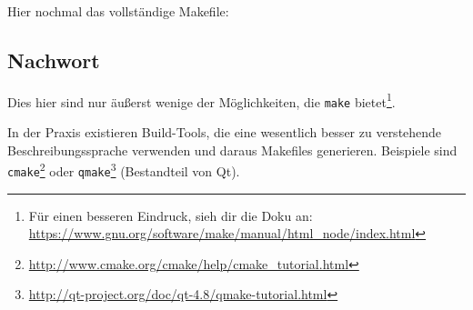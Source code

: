 Hier nochmal das vollständige Makefile:

\subsection{Nachwort}

Dies hier sind nur äußerst wenige der Möglichkeiten, die \texttt{make} bietet\footnote{Für einen besseren Eindruck, sieh dir die Doku an: \url{https://www.gnu.org/software/make/manual/html_node/index.html}}.

In der Praxis existieren Build-Tools, die eine wesentlich besser zu verstehende Beschreibungssprache verwenden und daraus Makefiles generieren.
Beispiele sind \texttt{cmake}\footnote{\url{http://www.cmake.org/cmake/help/cmake_tutorial.html}} oder \texttt{qmake}\footnote{\url{http://qt-project.org/doc/qt-4.8/qmake-tutorial.html}} (Bestandteil von Qt).
